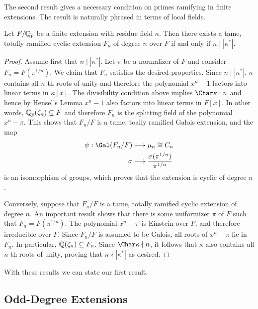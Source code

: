 The second result gives a necessary condition on primes ramifying in finite extensions. The result is naturally phrased in terms of local fields.

\begin{prop}\label{prop_totally_ramified}
    Let $F/\mathbb{Q}_p$ be a finite extension with residue field $\kappa$. Then there exists a tame, totally ramified cyclic extension $F_n$ of degree $n$ over $F$ if and only if $n\mid|\kappa^*|$.
\end{prop}

\begin{proof}
    Assume first that $n\mid|\kappa^*|$. Let $\pi$ be a normalizer of $F$ and consider $F_n=F(\pi^{1/n})$. We claim that $F_n$ satisfies the desired properties. Since $n\mid|\kappa^*|$, $\kappa$ contains all $n$-th roots of unity and therefore the polynomial $x^n-1$ factors into linear terms in $\kappa[x]$. The divisibility condition above implies $\Char\kappa\nmid n$ and hence by Hensel's Lemma $x^n-1$ also factors into linear terms in $F[x]$. In other words, $\mathbb{Q}_p(\zeta_n)\subseteq F$ and therefore $F_n$ is the splitting field of the polynomial $x^n-\pi$. This shows that $F_n/F$ is a tame, toally ramified Galois extension, and the map 
    \begin{align*}
        \psi: \Gal(F_n/F)&\longrightarrow \mu_n\cong C_n\\
        \sigma &\longmapsto \frac{\sigma(\pi^{1/n})}{\pi^{1/n}}
    \end{align*}
    is an isomorphism of groups, which proves that the extension is cyclic of degree $n$.

    Conversely, suppose that $F_n/F$ is a tame, totally ramified cyclic extension of degree $n$. An important result shows that there is some uniformizer $\pi$ of $F$ such that $F_n=F(\pi^{1/n})$. The polynomial $x^n-\pi$ is Einstein over $F$, and therefore irreducible over $F$. Since $F_n/F$ is assumed to be Galois, all roots of $x^n-\pi$ lie in $F_n$. In particular, $\mathbb{Q}(\zeta_n)\subseteq F_n$. Since $\Char\kappa\nmid n$, it follows that $\kappa$ also contains all $n$-th roots of unity, proving that $n\nmid|\kappa^*|$ as desired. 
    

\end{proof}

With these results we can state our first result.





\subsection{Odd-Degree Extensions}
